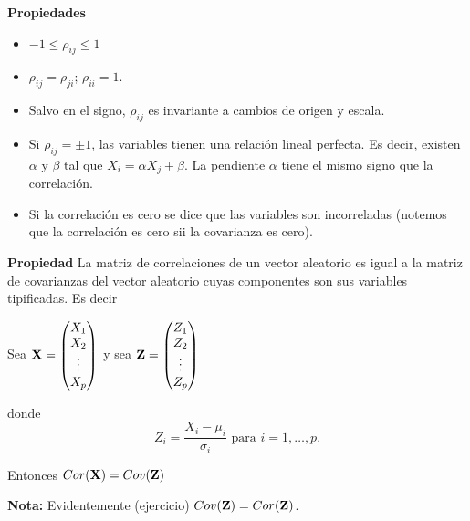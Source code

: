 \begin{frame}
\textbf{Propiedades}

\begin{itemize}
\item $-1\leq \rho_{i j}\leq 1$
\item  $\rho_{i j}= \rho_{j i}$; $\rho_{ii}=1$. 
\item Salvo en el signo, $\rho_{i j}$ es invariante a cambios de origen y escala.
\item Si $\rho_{i j}=\pm 1$, las variables tienen una relación lineal perfecta. Es decir, existen $\alpha$ y $\beta$ tal que $X_i=\alpha X_j+\beta$. La pendiente $\alpha$ tiene el mismo signo que la correlación.
\item  Si la correlación es cero se dice que las variables son incorreladas (notemos que la correlación es cero sii la covarianza es cero).
\end{itemize}

\end{frame}

\begin{frame}

\textbf{Propiedad} La matriz de correlaciones de un vector aleatorio es igual a la matriz de covarianzas del vector aleatorio cuyas componentes son  sus variables tipificadas. Es decir 

Sea $\mathbf{X}=\begin{pmatrix}X_1\\ X_2 \\\vdots \\ X_p\end{pmatrix}$ 
 y sea 
$\mathbf{Z}=\begin{pmatrix}Z_1\\ Z_2 \\ \vdots \\ Z_p\end{pmatrix}$

donde $$Z_i=\frac{X_i-\mu_i}{\sigma_i}\mbox{ para } i=1,\ldots,p.$$

Entonces $Cor(\mathbf{X})=Cov(\mathbf{Z})$

\textbf{Nota:} Evidentemente (ejercicio) $Cov(\mathbf{Z})=Cor(\mathbf{Z})$.
\end{frame}
